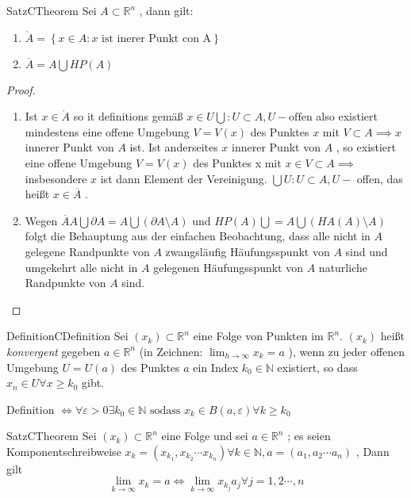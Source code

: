 \documentclass[a4paper]{memoir}
\begin{document}
\begin{ibox}[8]{Satz}{CTheorem}
    Sei $ A \subset \mathbb{R}^n $ , dann gilt:
	\begin{enumerate}[label=\alph*)]
		\item $ \mathring{A} = \left\{ x \in A : x \text{ ist inerer Punkt con A} \right\}  $ 
		\item $ \overline{A} = A \bigcup HP(A) $ 
 	\end{enumerate}
\end{ibox}
\begin{proof}
	\begin{enumerate}[label=\alph*)]
		\item Ist $ x \in \mathring{A} $ so it definitions gemäß $ x \in U \bigcup : U \subset A, U-\text{offen} $ 
			also existiert mindestens eine offene Umgebung $ V = V(x) $ des Punktes $ x  $ mit $ V \subset A \implies x $ innerer Punkt
			von $ A $ ist. Ist anderseites $ x $ innerer Punkt von $ A $ , so existiert eine offene Umgebung $ V = V(x) $ des 
			Punktes x mit $ x \in V \subset A \implies $ insbesondere $ x  $ ist dann Element der Vereinigung. 
			$ \bigcup U : U \subset A, U- $ offen, das heißt $ x \in \overline{A} $ .
		\item Wegen $ \overline{A} A \bigcup \partial A = A \bigcup \left( \partial A \setminus A \right) \text{ und } HP(A) \bigcup 
			= A \bigcup (HA(A)\setminus A) $  folgt die Behauptung aus der einfachen Beobachtung, dass alle nicht in $ A $ gelegene
			Randpunkte von $ A $ zwangsläufig Häufungsspunkt von $ A $ sind und umgekehrt alle nicht in $ A $ gelegenen Häufungsspunkt 
			von $ A $ naturliche Randpunkte von $ A $ sind. 
	\end{enumerate}
	 
\end{proof}
\begin{ibox}{Definition}{CDefinition}
    Sei $ \left( x_k \right) \subset \mathbb{R}^n $ eine Folge von Punkten im $ \mathbb{R}^n $. $ (x_k) $ heißt \textit{konvergent}
	gegeben $ a \in \mathbb{R}^n $ (in Zeichnen: $ \lim_{h \to \infty} x_k = a$ ), wenn zu jeder offenen Umgebung $ U = U(a) $ des 
	Punktes $ a $ ein Index $ k_0 \in \mathbb{N}$ existiert, so dass $ x_n \in U \forall x \geq k_0$ gibt. 
\end{ibox}
Definition $ \iff \forall \varepsilon > 0 \exists k_0 \in \mathbb{N} \text{ sodass } x_k \in B(a, \varepsilon)	\forall k \geq k_0 $ 
\begin{ibox}[9]{Satz}{CTheorem}
    Sei $ \left( x_k \right) \subset \mathbb{R}^n $ eine Folge und sei $ a \in \mathbb{R}^n $ ; es seien Komponentschreibweise 
$ x_k = \left( x_{k_1}, x_{k_2} \cdots x_{k_n} \right) \forall k \in \mathbb{N}, a = (a_1,a_2 \cdots a_{n})  $ , Dann gilt 
$$ \lim_{k \to \infty} x_{k} = a \iff \lim_{k \to \infty}x_{k_{j}} a_{j} \forall j = 1,2 \cdots, n$$
\end{ibox}
\end{document}
